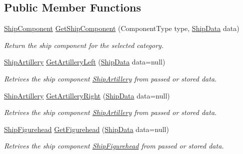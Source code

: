 \subsection*{Public Member Functions}
\begin{DoxyCompactItemize}
\item 
\hyperlink{class_skyrates_1_1_ship_1_1_ship_component}{Ship\-Component} \hyperlink{class_skyrates_1_1_ship_1_1_ship_rig_a0683d328fd5eb6143da734859c57cf61}{Get\-Ship\-Component} (Component\-Type type, \hyperlink{class_skyrates_1_1_ship_1_1_ship_data}{Ship\-Data} data)
\begin{DoxyCompactList}\small\item\em Return the ship component for the selected category. \end{DoxyCompactList}\item 
\hyperlink{class_skyrates_1_1_ship_1_1_ship_artillery}{Ship\-Artillery} \hyperlink{class_skyrates_1_1_ship_1_1_ship_rig_a937596cc5c5ba55f388e74853bdbaac8}{Get\-Artillery\-Left} (\hyperlink{class_skyrates_1_1_ship_1_1_ship_data}{Ship\-Data} data=null)
\begin{DoxyCompactList}\small\item\em Retrives the ship component \hyperlink{class_skyrates_1_1_ship_1_1_ship_artillery}{Ship\-Artillery} from passed or stored data. \end{DoxyCompactList}\item 
\hyperlink{class_skyrates_1_1_ship_1_1_ship_artillery}{Ship\-Artillery} \hyperlink{class_skyrates_1_1_ship_1_1_ship_rig_a050643874130b5c49abc0af53e8dbc05}{Get\-Artillery\-Right} (\hyperlink{class_skyrates_1_1_ship_1_1_ship_data}{Ship\-Data} data=null)
\begin{DoxyCompactList}\small\item\em Retrives the ship component \hyperlink{class_skyrates_1_1_ship_1_1_ship_artillery}{Ship\-Artillery} from passed or stored data. \end{DoxyCompactList}\item 
\hyperlink{class_skyrates_1_1_ship_1_1_ship_figurehead}{Ship\-Figurehead} \hyperlink{class_skyrates_1_1_ship_1_1_ship_rig_a29a059de9ce59833c8979798cec4f2d8}{Get\-Figurehead} (\hyperlink{class_skyrates_1_1_ship_1_1_ship_data}{Ship\-Data} data=null)
\begin{DoxyCompactList}\small\item\em Retrives the ship component \hyperlink{class_skyrates_1_1_ship_1_1_ship_figurehead}{Ship\-Figurehead} from passed or stored data. \end{DoxyCompactList}\item 

\end{DoxyCompactItemize}
